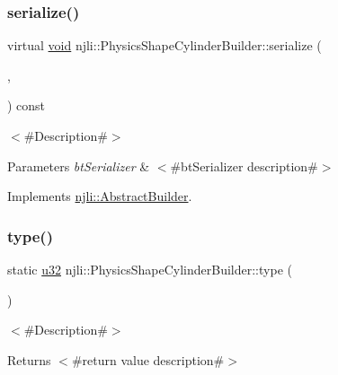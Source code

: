 \subsubsection{\texorpdfstring{serialize()}{serialize()}}
{\footnotesize\ttfamily virtual \mbox{\hyperlink{_thread_8h_af1e856da2e658414cb2456cb6f7ebc66}{void}} njli\+::\+Physics\+Shape\+Cylinder\+Builder\+::serialize (\begin{DoxyParamCaption}\item[{\mbox{\hyperlink{_thread_8h_af1e856da2e658414cb2456cb6f7ebc66}{void}} $\ast$}]{,  }\item[{bt\+Serializer $\ast$}]{ }\end{DoxyParamCaption}) const\hspace{0.3cm}{\ttfamily [virtual]}}

$<$\#\+Description\#$>$


\begin{DoxyParams}{Parameters}
{\em bt\+Serializer} & $<$\#bt\+Serializer description\#$>$ \\
\hline
\end{DoxyParams}


Implements \mbox{\hyperlink{classnjli_1_1_abstract_builder_ab66b774e02ccb9da554c9aab7fa6d981}{njli\+::\+Abstract\+Builder}}.

\mbox{\label{classnjli_1_1_physics_shape_cylinder_builder_a660431da9254ce3526856075bd85a535}} 
\subsubsection{\texorpdfstring{type()}{type()}}
{\footnotesize\ttfamily static \mbox{\hyperlink{_util_8h_a10e94b422ef0c20dcdec20d31a1f5049}{u32}} njli\+::\+Physics\+Shape\+Cylinder\+Builder\+::type (\begin{DoxyParamCaption}{ }\end{DoxyParamCaption})\hspace{0.3cm}{\ttfamily [static]}}

$<$\#\+Description\#$>$

\begin{DoxyReturn}{Returns}
$<$\#return value description\#$>$ 
\end{DoxyReturn}


